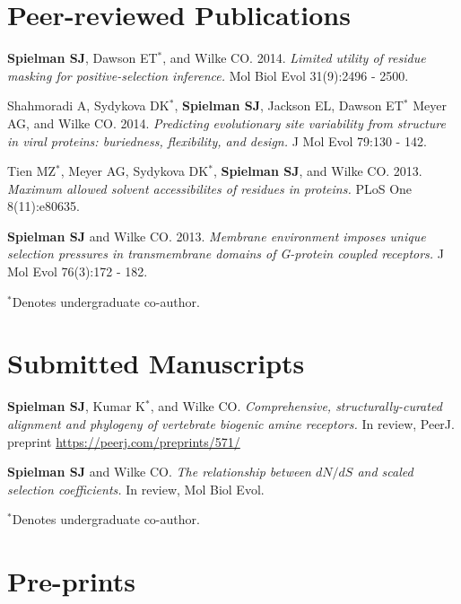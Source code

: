\documentclass[line, margin]{res}
\begin{document}
\begin{resume}
\vspace{0.75cm}
		



\vspace{0.75cm}

\section{Peer-reviewed Publications}

\textbf{Spielman SJ}, Dawson ET$^\ast$, and Wilke CO. 2014. \emph{Limited utility of residue masking for positive-selection inference.} Mol Biol Evol 31(9):2496 - 2500.

Shahmoradi A, Sydykova DK$^\ast$, \textbf{Spielman SJ}, Jackson EL, Dawson ET$^\ast$ Meyer AG, and Wilke CO. 2014. \emph{Predicting evolutionary site variability from structure in viral proteins: buriedness, flexibility, and design.} J Mol Evol 79:130 - 142.

Tien MZ$^\ast$, Meyer AG, Sydykova DK$^\ast$, \textbf{Spielman SJ}, and Wilke CO. 2013. \emph{Maximum allowed solvent accessibilites of residues in proteins.} PLoS One 8(11):e80635.


\textbf{Spielman SJ} and Wilke CO. 2013. \emph{Membrane environment imposes unique selection pressures in transmembrane domains of G-protein coupled receptors.} J Mol Evol 76(3):172 - 182.


$^\ast$Denotes undergraduate co-author.

\vspace{0.75cm}


\section{Submitted Manuscripts}

\textbf{Spielman SJ}, Kumar K$^\ast$, and Wilke CO. \emph{Comprehensive, structurally-curated alignment and phylogeny of vertebrate biogenic amine receptors.} In review, PeerJ. preprint \url{https://peerj.com/preprints/571/}


\textbf{Spielman SJ} and Wilke CO. \emph{The relationship between $dN/dS$ and scaled selection coefficients.}  In review, Mol Biol Evol.

$^\ast$Denotes undergraduate co-author.

\vspace{0.75cm}

\section{Pre-prints}


\end{resume}
\end{document}
